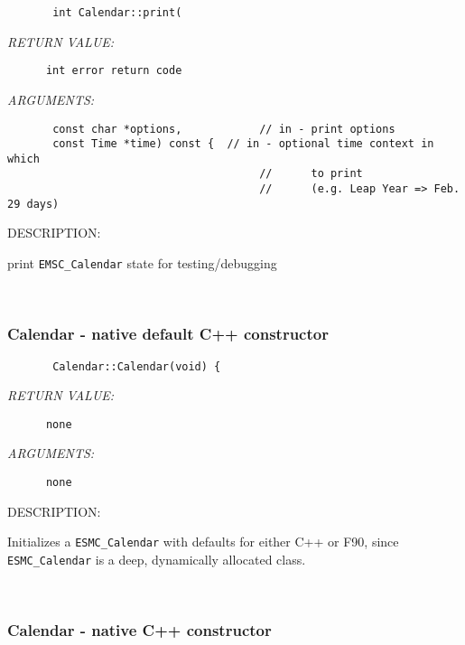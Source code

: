   
\begin{verbatim}       int Calendar::print(\end{verbatim}{\em RETURN VALUE:}
\begin{verbatim}      int error return code\end{verbatim}{\em ARGUMENTS:}
\begin{verbatim}       const char *options,            // in - print options
       const Time *time) const {  // in - optional time context in which
                                       //      to print
                                       //      (e.g. Leap Year => Feb. 29 days)\end{verbatim}
{\sf DESCRIPTION:\\ }


        print {\tt EMSC\_Calendar} state for testing/debugging
   
 
\mbox{}\hrulefill\ 
 
\subsubsection [Calendar] {Calendar - native default C++ constructor}


  
\begin{verbatim}       Calendar::Calendar(void) {\end{verbatim}{\em RETURN VALUE:}
\begin{verbatim}      none\end{verbatim}{\em ARGUMENTS:}
\begin{verbatim}      none\end{verbatim}
{\sf DESCRIPTION:\\ }


        Initializes a {\tt ESMC\_Calendar} with defaults for either
        C++ or F90, since {\tt ESMC\_Calendar} is a deep, dynamically
        allocated class.
   
 
\mbox{}\hrulefill\ 
 
\subsubsection [Calendar] {Calendar - native C++ constructor}



